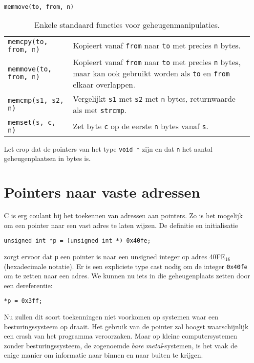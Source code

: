 \hbox{\texttt{memmove(to, from, n)}}
\begin{table}[!ht]
\centering
\caption{Enkele standaard functies voor geheugenmanipulaties.}
\label{tab:arymemmanip}
\begin{tabular}{@{}p{}p{10cm}@{}}
\toprule
\texttt{memcpy(to, from, n)} &  Kopieert vanaf \texttt{from} naar \texttt{to} met precies \texttt{n} bytes.\\
\texttt{memmove(to, from, n)} &  Kopieert vanaf \texttt{from} naar \texttt{to} met precies \texttt{n} bytes, maar kan ook gebruikt worden als \texttt{to} en \texttt{from} elkaar overlappen.\\
\texttt{memcmp(s1, s2, n)} &  Vergelijkt \texttt{s1} met \texttt{s2} met \texttt{n} bytes, returnwaarde als met \texttt{strcmp}.\\
\texttt{memset(s, c, n)} & Zet byte \texttt{c} op de eerste \texttt{n} bytes vanaf \texttt{s}.\\
\bottomrule
\end{tabular} 
\end{table}

Let erop dat de pointers van het type \texttt{void *} zijn en dat \texttt{n} het aantal geheugenplaatsen in bytes is.


\advanced
\section{Pointers naar vaste adressen}
C is erg coulant bij het toekennen van adressen aan pointers. Zo is het mogelijk om een pointer naar een vast adres te laten wijzen.
De definitie en initialisatie

\hspace*{1em}\texttt{unsigned int *p = (unsigned int *) 0x40fe;}

zorgt ervoor dat \texttt{p} een pointer is naar een unsigned integer op adres 40FE$_{16}$ (hexadecimale notatie). Er is een expliciete type cast nodig om de integer \texttt{0x40fe} om te zetten naar een adres. We kunnen nu iets in die geheugenplaats zetten door een dereferentie:

\hspace*{1em}\texttt{*p = 0x3ff;}

Nu zullen dit soort toekenningen niet voorkomen op systemen waar een besturingssysteem op draait. Het gebruik van de pointer zal hoogst waarschijnlijk een crash van het programma veroorzaken. Maar op kleine computersystemen zonder besturingssysteem, de zogenoemde \textsl{bare metal}-systemen, is het vaak de enige manier om informatie naar binnen en naar buiten te krijgen.

